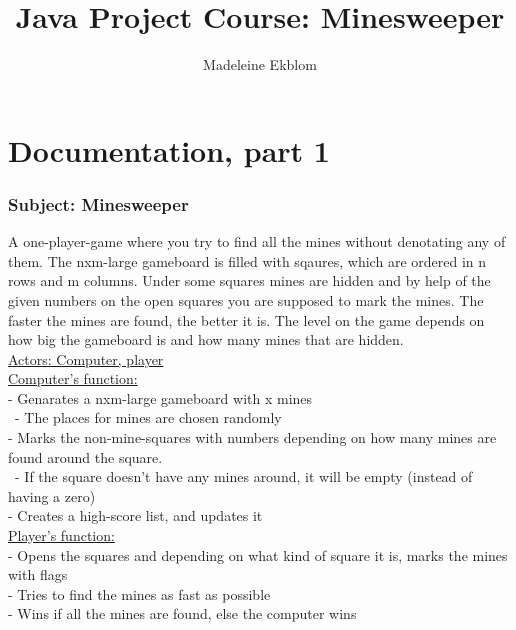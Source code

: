 \documentclass[12pt,twoside,a4paper]{article}
\title{Java Project Course: Minesweeper}
\author{Madeleine Ekblom}
\begin{document}
\maketitle
\section{Documentation, part 1}

\subsubsection*{Subject: Minesweeper}
A one-player-game where you try to find all the mines without denotating any of them. The nxm-large gameboard 
is filled with sqaures, which are ordered in n rows and m columns. Under some squares mines are hidden and by 
help of the given numbers on the open squares you are supposed to mark the mines. The faster the mines are found, 
the better it is. The level on the game depends on how big the gameboard is and how many mines that are hidden.  \\

\underline{Actors: Computer, player} \\ 

\underline{Computer's function:} \\
	- Genarates a nxm-large gameboard with x mines \\
	\ 	- The places for mines are chosen randomly \\
	- Marks the non-mine-squares with numbers depending on how many mines are found around the square. \\
	  \ - If the square doesn't have any mines around, it will be empty (instead of having a zero) \\
	- Creates a high-score list, and updates it  \\

\underline{Player's function:} \\
	- Opens the squares and depending on what kind of square it is, marks the mines with flags \\
	- Tries to find the mines as fast as possible \\ 
	- Wins if all the mines are found, else the computer wins \\
\end{document}
